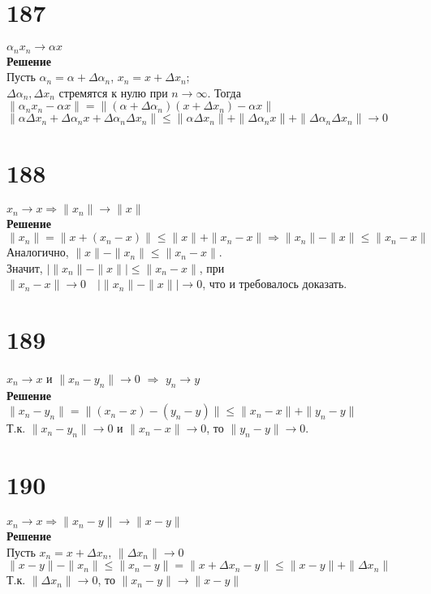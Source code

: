 \documentclass[a4paper]{article}
\begin{document}
\section*{187}
$\alpha_n x_n \to \alpha x$\\
\textbf{Решение}\\
Пусть $ \alpha_n = \alpha + \Delta \alpha_n $, $ x_n = x + \Delta x_n $;\\
 $\Delta \alpha_n, \Delta x_n$ стремятся к нулю при $ n \rightarrow \infty $. 
Тогда $\| \alpha_n x_n - \alpha x \| = \| (\alpha + \Delta \alpha_n) (x + \Delta x_n) - \alpha x \|$\\
$\| \alpha \Delta x_n + \Delta \alpha_n x + \Delta \alpha_n \Delta x_n \| \le \| \alpha \Delta x_n \| + \| \Delta \alpha_n x \| + \| \Delta \alpha_n \Delta x_n \| \rightarrow 0$\\

\section*{188}
$x_n \to x \Rightarrow \|x_n\| \to \|x\|$\\
\textbf{Решение}\\
$\|x_n\| = \|x + (x_n - x)\| \le \|x\| + \|x_n - x\| \Rightarrow \|x_n\| - \|x\| \le \|x_n - x\| $\\
Аналогично, $ \|x\| - \|x_n\| \le \|x_n - x\| $.\\
Значит, $ \left|\|x_n\| - \|x\|\right| \le \|x_n - x\| $, при $ \|x_n - x\| \rightarrow 0 \quad \left|\|x_n\| - \|x\|\right| \rightarrow 0$, что и требовалось доказать.\\


\section*{189}
$x_n \to x$ и $\|x_n - y_n\| \to 0$ $\Rightarrow$ $y_n \to y$\\
\textbf{Решение}\\
$\|x_n - y_n\| = \|(x_n - x) - (y_n - y)\| \le \|x_n - x\| + \|y_n - y\|$\\
Т.к. $\|x_n - y_n\| \to 0$ и $\|x_n - x\| \to 0$, то $\|y_n - y\| \to 0$.

\section*{190}
$x_n \to x \Rightarrow \| x_n - y\| \to \| x-y \|$\\
\textbf{Решение}\\
Пусть $x_n = x + \Delta x_n$, $\| \Delta x_n \| \to 0$\\
$\| x-y\| - \|x_n\| \le \| x_n - y\| = \|x + \Delta x_n - y\| \le \|x-y\| + \|\Delta x_n\|$\\
Т.к. $\|\Delta x_n\| \to 0$, то $\|x_n-y\| \to \|x-y\|$
\end{document}
